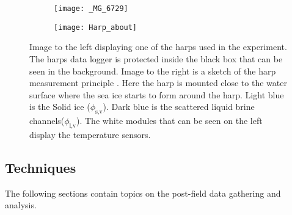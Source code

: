 \begin{figure}[h!]
\centering
	\begin{subfigure}{0.4\linewidth}
		\centering
		\texttt{[image: \_MG\_6729]}
	\end{subfigure}\quad
	\begin{subfigure}{0.4\linewidth}
		\centering
		\texttt{[image: Harp\_about]}
	\end{subfigure}
\caption{Image to the left displaying one of the harps used in the experiment. The harps data logger is protected inside the black box that can be seen in the background. Image to the right is a sketch of the harp measurement principle \textcite{Fuchs}. Here the harp is mounted close to the water surface where the sea ice starts to form around the harp. Light blue is the Solid ice ($\phi_{\text{s,v}}$). Dark blue is the scattered liquid brine channels($\phi_{\text{l,v}}$). The white modules that can be seen on the left display the temperature sensors. }
\label{Harp}
\end{figure}


\subsection{Techniques}
The following sections contain topics on the post-field data gathering and analysis.

